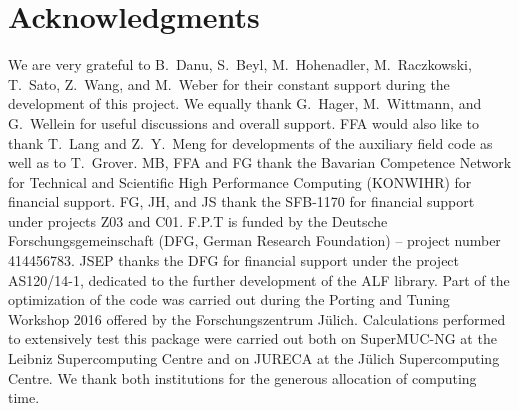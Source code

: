 

\section*{Acknowledgments} 

%

We are very grateful to  B.~Danu, S.~Beyl, M.~Hohenadler,  M.~Raczkowski, T.~Sato, Z.~Wang, and M.~Weber for their constant support during the development of this project.
We equally thank G.~Hager, M.~Wittmann, and G.~Wellein for useful discussions and overall support.
FFA would also like to thank T.~Lang  and Z.~Y.~Meng for developments of the auxiliary field code as well as to T.~Grover. 
MB, FFA  and FG thank the Bavarian Competence Network for Technical and Scientific High Performance Computing (KONWIHR) for financial support.
FG, JH, and JS thank the SFB-1170 for  financial support under projects Z03 and C01.
F.P.T is funded by the Deutsche Forschungsgemeinschaft (DFG, German Research Foundation) -- project number 414456783.
JSEP  thanks the DFG for financial support under the project AS120/14-1, dedicated to the further development of the ALF library.
Part of the optimization of the code was carried out during  the  Porting and Tuning Workshop 2016 offered by the Forschungszentrum J\"ulich.
Calculations performed to extensively test this package were carried out both on  SuperMUC-NG at the  Leibniz Supercomputing Centre and on  JURECA  \cite{Jureca16} at the J\"ulich Supercomputing Centre.  We thank both institutions for the generous allocation of computing time.
